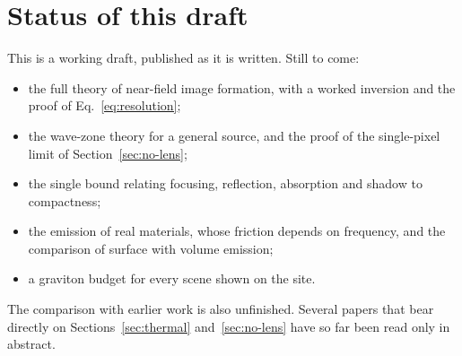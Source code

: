 \section{Status of this draft}\label{sec:status}

This is a working draft, published as it is written. Still to come:
\begin{itemize}
\item the full theory of near-field image formation, with a worked inversion
and the proof of Eq.~\eqref{eq:resolution};
\item the wave-zone theory for a general source, and the proof of the
single-pixel limit of Section~\ref{sec:no-lens};
\item the single bound relating focusing, reflection, absorption and shadow to
compactness;
\item the emission of real materials, whose friction depends on frequency,
and the comparison of surface with volume emission;
\item a graviton budget for every scene shown on the site.
\end{itemize}
The comparison with earlier work is also unfinished. Several papers that bear
directly on Sections~\ref{sec:thermal} and~\ref{sec:no-lens} have so far been
read only in abstract.
